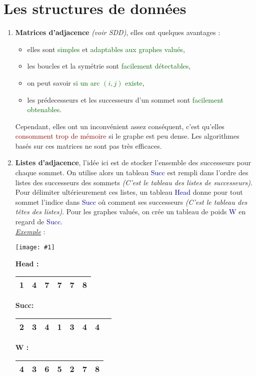\documentclass{article}
\newcommand{\gre}[1]{\textcolor{darkgreen}{#1}}
\newcommand{\blu}[1]{\textcolor{darkblue}{#1}}
\newcommand{\red}[1]{\textcolor{darkred}{#1}}
\newcommand{\imgR}[2]{\begin{center}\texttt{[image: \#1]}\end{center}}
\begin{document}
\section{Les structures de données}

\begin{enumerate}
\item \textbf{Matrices d'adjacence} \textit{(voir SDD)}, elles ont quelques avantages :
	\begin{itemize}
	\item elles sont \gre{simples} et \gre{adaptables aux graphes valués},
	\item les boucles et la symétrie sont \gre{facilement détectables},
	\item on peut savoir \gre{si un arc $(i,j)$ existe},
	\item les prédecesseurs et les successeurs d'un sommet sont \gre{facilement obtenables}.
	\end{itemize}
	Cependant, elles ont un inconvénient assez conséquent, c'est qu'elles \red{consomment trop de mémoire} si le graphe est peu dense. Les algorithmes basés sur ces matrices ne
	sont pas très efficaces.\\
\item \textbf{Listes d'adjacence}, l'idée ici est de stocker l'ensemble des successeurs pour chaque sommet. On utilise alors un tableau \blu{Succ} est rempli dans l'ordre des listes 
des successeurs des sommets \textit{(C'est le tableau des listes de successeurs)}. Pour délimiter ultérieurement ces listes, un tableau \blu{Head} donne pour tout sommet l'indice 
dans \blu{Succ} où comment ses successeurs \textit{(C'est le tableau des têtes des listes)}. Pour les graphes valués, on crée un tableau de poids \blu{W} en regard de \blu{Succ}.\\
\textit{\underline{Exemple}} :  \\
\imgR{OCTG_001.png}{300}
\textbf{Head : }	\begin{tabular}{|c|c|c|c|c|c|}
	\hline
	1 & 4 & 7 & 7 & 7 & 8 \\
	\hline
	\end{tabular}
\textbf{Succ: }	\begin{tabular}{|c|c|c|c|c|c|c|c|}
	\hline
	2 & 3 & 4 & 1 & 3 & 4 & 4 & \\
	\hline
	\end{tabular}
\textbf{W : }	\begin{tabular}{|c|c|c|c|c|c|c|}
	\hline
	4 & 3 & 6 & 5 & 2 & 7 & 8 \\
	\hline
	\end{tabular} \\
$ $ \\


\end{enumerate}
\end{document}
